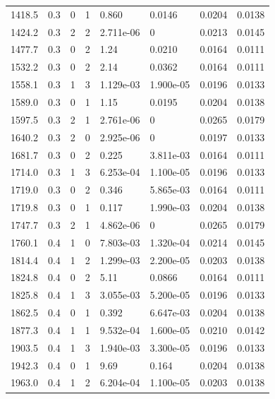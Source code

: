 \documentclass[preview]{standalone}
\begin{document}
{{{\begin{tabular}{L{1.2cm}C{1.2cm} C{0.3cm}C{0.5cm} C{1.4cm}C{1.4cm} C{1.4cm}C{1.4cm}}
  1418.5  &   0.3  & 0     &  1 &  0.860  & 0.0146  & 0.0204 &  0.0138   \\ 
  1424.2  &   0.3  & 2     &  2 &  2.711e-06  & 0  & 0.0213 &  0.0145   \\ 
  1477.7  &   0.3  & 0     &  2 &  1.24  & 0.0210  & 0.0164 &  0.0111   \\ 
  1532.2  &   0.3  & 0     &  2 &  2.14  & 0.0362  & 0.0164 &  0.0111   \\ 
  1558.1  &   0.3  & 1     &  3 &  1.129e-03  & 1.900e-05  & 0.0196 &  0.0133   \\ 
  1589.0  &   0.3  & 0     &  1 &  1.15  & 0.0195  & 0.0204 &  0.0138   \\ 
  1597.5  &   0.3  & 2     &  1 &  2.761e-06  & 0  & 0.0265 &  0.0179   \\ 
  1640.2  &   0.3  & 2     &  0 &  2.925e-06  & 0  & 0.0197 &  0.0133   \\ 
  1681.7  &   0.3  & 0     &  2 &  0.225  & 3.811e-03  & 0.0164 &  0.0111   \\ 
  1714.0  &   0.3  & 1     &  3 &  6.253e-04  & 1.100e-05  & 0.0196 &  0.0133   \\ 
  1719.0  &   0.3  & 0     &  2 &  0.346  & 5.865e-03  & 0.0164 &  0.0111   \\ 
  1719.8  &   0.3  & 0     &  1 &  0.117  & 1.990e-03  & 0.0204 &  0.0138   \\ 
  1747.7  &   0.3  & 2     &  1 &  4.862e-06  & 0  & 0.0265 &  0.0179   \\ 
  1760.1  &   0.4  & 1     &  0 &  7.803e-03  & 1.320e-04  & 0.0214 &  0.0145   \\ 
  1814.4  &   0.4  & 1     &  2 &  1.299e-03  & 2.200e-05  & 0.0203 &  0.0138   \\ 
  1824.8  &   0.4  & 0     &  2 &  5.11  & 0.0866  & 0.0164 &  0.0111   \\ 
  1825.8  &   0.4  & 1     &  3 &  3.055e-03  & 5.200e-05  & 0.0196 &  0.0133   \\ 
  1862.5  &   0.4  & 0     &  1 &  0.392  & 6.647e-03  & 0.0204 &  0.0138   \\ 
  1877.3  &   0.4  & 1     &  1 &  9.532e-04  & 1.600e-05  & 0.0210 &  0.0142   \\ 
  1903.5  &   0.4  & 1     &  3 &  1.940e-03  & 3.300e-05  & 0.0196 &  0.0133   \\ 
  1942.3  &   0.4  & 0     &  1 &  9.69  & 0.164  & 0.0204 &  0.0138   \\ 
  1963.0  &   0.4  & 1     &  2 &  6.204e-04  & 1.100e-05  & 0.0203 &  0.0138   \\ 

\end{tabular}}}}
\end{document}
